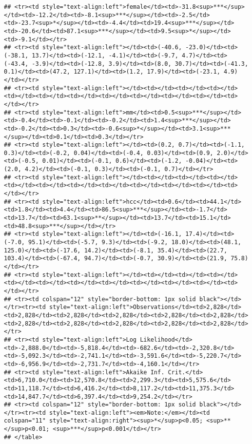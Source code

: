 \documentclass[]{article}
\begin{document}
\begin{verbatim}
## <tr><td style="text-align:left">female</td><td>-31.8<sup>***</sup></td><td>-12.2</td><td>-8.1<sup>***</sup></td><td>-2.5</td><td>-23.7<sup>*</sup></td><td>-4.4</td><td>19.4<sup>***</sup></td><td>-20.6</td><td>87.1<sup>***</sup></td><td>9.5<sup>*</sup></td><td>-9.1</td></tr>
## <tr><td style="text-align:left"></td><td>(-40.6, -23.0)</td><td>(-38.1, 13.7)</td><td>(-12.1, -4.1)</td><td>(-9.7, 4.7)</td><td>(-43.4, -3.9)</td><td>(-12.8, 3.9)</td><td>(8.0, 30.7)</td><td>(-41.3, 0.1)</td><td>(47.2, 127.1)</td><td>(1.2, 17.9)</td><td>(-23.1, 4.9)</td></tr>
## <tr><td style="text-align:left"></td><td></td><td></td><td></td><td></td><td></td><td></td><td></td><td></td><td></td><td></td><td></td></tr>
## <tr><td style="text-align:left">mm</td><td>0.5<sup>***</sup></td><td>-0.4</td><td>-0.1</td><td>-0.2</td><td>1.4<sup>***</sup></td><td>-0.2</td><td>0.3</td><td>-0.6<sup>*</sup></td><td>3.1<sup>***</sup></td><td>0.1</td><td>0.3</td></tr>
## <tr><td style="text-align:left"></td><td>(0.2, 0.7)</td><td>(-1.1, 0.3)</td><td>(-0.2, 0.04)</td><td>(-0.4, 0.03)</td><td>(0.9, 2.0)</td><td>(-0.5, 0.01)</td><td>(-0.1, 0.6)</td><td>(-1.2, -0.04)</td><td>(2.0, 4.2)</td><td>(-0.1, 0.3)</td><td>(-0.1, 0.7)</td></tr>
## <tr><td style="text-align:left"></td><td></td><td></td><td></td><td></td><td></td><td></td><td></td><td></td><td></td><td></td><td></td></tr>
## <tr><td style="text-align:left">hcc</td><td>0.6</td><td>44.1</td><td>1.8</td><td>4.4</td><td>86.5<sup>***</sup></td><td>-1.7</td><td>13.7</td><td>63.1<sup>**</sup></td><td>13.7</td><td>15.1</td><td>48.8<sup>***</sup></td></tr>
## <tr><td style="text-align:left"></td><td>(-16.1, 17.4)</td><td>(-7.0, 95.1)</td><td>(-5.7, 9.3)</td><td>(-9.2, 18.0)</td><td>(48.1, 125.0)</td><td>(-17.6, 14.2)</td><td>(-8.1, 35.4)</td><td>(22.7, 103.4)</td><td>(-67.4, 94.7)</td><td>(-0.7, 30.9)</td><td>(21.9, 75.8)</td></tr>
## <tr><td style="text-align:left"></td><td></td><td></td><td></td><td></td><td></td><td></td><td></td><td></td><td></td><td></td><td></td></tr>
## <tr><td colspan="12" style="border-bottom: 1px solid black"></td></tr><tr><td style="text-align:left">Observations</td><td>2,828</td><td>2,828</td><td>2,828</td><td>2,828</td><td>2,828</td><td>2,828</td><td>2,828</td><td>2,828</td><td>2,828</td><td>2,828</td><td>2,828</td></tr>
## <tr><td style="text-align:left">Log Likelihood</td><td>-2,888.0</td><td>-5,818.4</td><td>-682.6</td><td>-2,320.8</td><td>-5,092.3</td><td>-2,741.1</td><td>-3,591.6</td><td>-5,220.7</td><td>-6,956.9</td><td>-2,731.7</td><td>-4,160.1</td></tr>
## <tr><td style="text-align:left">Akaike Inf. Crit.</td><td>6,710.0</td><td>12,570.8</td><td>2,299.3</td><td>5,575.6</td><td>11,118.7</td><td>6,416.2</td><td>8,117.2</td><td>11,375.3</td><td>14,847.7</td><td>6,397.4</td><td>9,254.2</td></tr>
## <tr><td colspan="12" style="border-bottom: 1px solid black"></td></tr><tr><td style="text-align:left"><em>Note:</em></td><td colspan="11" style="text-align:right"><sup>*</sup>p<0.05; <sup>**</sup>p<0.01; <sup>***</sup>p<0.001</td></tr>
## </table>
\end{verbatim}
\end{document}
